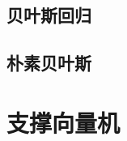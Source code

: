 \subsection{贝叶斯回归} %
\label{sub:贝叶斯回归}


\subsection{朴素贝叶斯} %
\label{sub:朴素贝叶斯}






\section{支撑向量机} %
\label{sec:支撑向量机}



